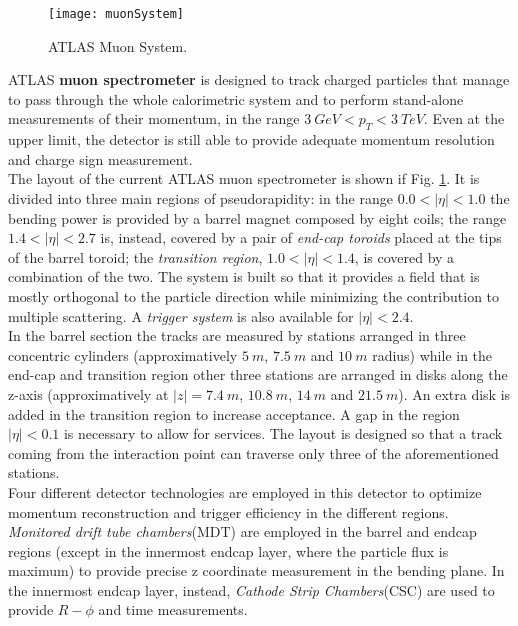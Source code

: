 \documentclass[a4paper,twoside,12pt]{article}
\begin{document}
\begin{figure} [h]
	\centering
	\texttt{[image: muonSystem]}
	\caption{ATLAS Muon System\cite{muon_tdr}.}
	\label{fig:muonSystem}
\end{figure}

ATLAS \textbf{muon spectrometer} is designed to track charged particles that manage to pass through the whole calorimetric system and to perform stand-alone measurements of their momentum, in the range 
$3\ GeV < p_{T} < 3\ TeV$. Even at the upper limit, the detector is still able to provide adequate momentum resolution and charge sign measurement.\\

The layout of the current  ATLAS muon spectrometer is shown if Fig. \ref{fig:muonSystem}. It is divided into three main regions of pseudorapidity: in the range $0.0 < |\eta| < 1.0$ the bending power
is provided by a barrel magnet composed by eight coils; the range $1.4 < |\eta| < 2.7$ is, instead, covered by a pair of \textit{end-cap toroids} placed at the tips of the barrel toroid; the \textit{transition
region}, $1.0 < |\eta| < 1.4$, is covered by a combination of the two. The system is built so that it provides a field that is mostly orthogonal to the particle direction while minimizing the contribution to multiple scattering. A \textit{trigger system} is also available for $|\eta| < 2.4$. \\

In the barrel section the tracks are measured by stations arranged in three concentric cylinders (approximatively $5\ m$, $7.5\ m$ and $10\ m$ radius) while in the end-cap and
transition region other three stations are arranged in disks along the z-axis (approximatively at  $|z| = 7.4\ m$, $10.8\ m$, $14\ m$ and $21.5\ m$). An extra disk is added in the transition
region to increase acceptance. A gap in the region $|\eta| < 0.1$ is necessary to allow for services. The layout is designed so that a track coming from the interaction point can traverse only three of the aforementioned stations.\\

Four different detector technologies are employed in this detector to optimize momentum reconstruction and trigger efficiency in the 
different regions.  \textit{Monitored drift tube chambers}(MDT) are employed in the barrel and endcap regions (except in the innermost endcap layer, where the particle flux is maximum) to provide precise z coordinate measurement in the bending plane. In the innermost endcap layer, instead, \textit{Cathode Strip Chambers}(CSC) are used to provide $R-\phi$ and time measurements. \\
\end{document}
